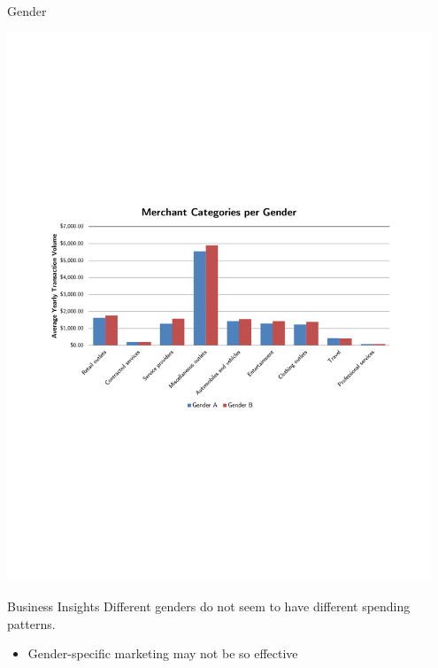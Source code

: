\documentclass[xcolor=dvipsnames]{beamer}
\begin{document}
\begin{frame}[t]{Gender}
	\vspace{-6pt}
	\centerline{\includegraphics[width=0.95\textwidth]{cats-per-gender}}
	\vspace{-8pt}
	\begin{block}{Business Insights}
		\small
		Different genders do not seem to have different spending patterns.\\[-8pt]
		\begin{itemize}
			\item Gender-specific marketing may not be so effective
		\end{itemize}
	\end{block}
\end{frame}
\end{document}
